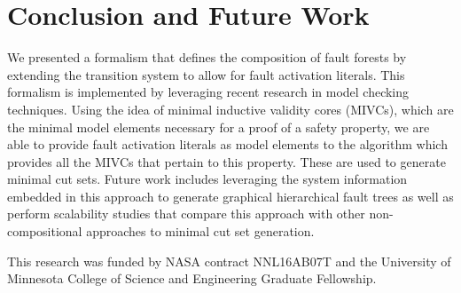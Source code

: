 \section{Conclusion and Future Work}
We presented a formalism that defines the composition of fault forests by extending the transition system to allow for fault activation literals. This formalism is implemented by leveraging recent research in model checking techniques. Using the idea of minimal inductive validity cores (MIVCs), which are the minimal model elements necessary for a proof of a safety property, we are able to provide fault activation literals as model elements to the \aivcalg algorithm which provides all the MIVCs that pertain to this property. These are used to generate minimal cut sets. Future work includes leveraging the system information embedded in this approach to generate graphical hierarchical fault trees as well as perform scalability studies that compare this approach with other non-compositional approaches to minimal cut set generation.  %


\vspace{2 mm}
 This research was funded by NASA contract NNL16AB07T and the University of Minnesota College of Science and Engineering Graduate Fellowship.


